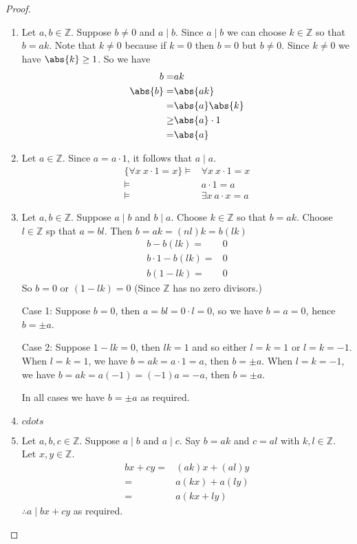 \begin{proof}
\leavevmode
\begin{enumerate}
    \item Let $a,b\in\mathbb{Z}$. Suppose $b\neq 0$ and $a\mid b$. Since $a\mid b$ we can choose $k\in\mathbb{Z}$ so that $b=ak$. Note that $k\neq 0$ because if $k=0$ then $b = 0$ but $b\neq 0$. Since $k\neq 0$ we have $\abs{k}\geq 1$. So we have 
    \begin{align*}
        b =& ak \\
        \abs{b} = & \abs{ak} \\
         = & \abs{a} \abs{k}\\
        \geq & \abs{a}\cdot 1 \\
        = & \abs{a}
    \end{align*}
    \item Let $a\in\mathbb{Z}$. Since $a= a\cdot 1$, it follows that $a\mid a$.
    \begin{align*}
        \{\forall x \ x\cdot 1 = x\} \vDash & \forall x \ x\cdot 1 = x \\
        \vDash & a\cdot 1 = a \\
        \vDash & \exists x \ a\cdot x = a
    \end{align*}
    \item Let $a,b\in\mathbb{Z}$. Suppose $a\mid b$ and $b\mid a$. Choose $k\in\mathbb{Z}$ so that $b=ak$. Choose $l\in\mathbb{Z}$ sp that $a=bl$. Then $b=ak=(nl)k = b(lk)$
    \begin{align*}
        b - b(lk) =& 0 \\
        b\cdot 1 - b(lk) = & 0 \\
        b(1-lk) = & 0 
    \end{align*}
    So $b=0$ or $(1-lk) = 0$ (Since $\mathbb{Z}$ has no zero divisors.)
    
    Case 1: Suppose $b=0$, then $a = bl = 0\cdot l = 0$, so we have $b = a = 0$, hence $b=\pm a$.
    
    Case 2: Suppose $1-lk = 0$, then $lk = 1$ and so either $l=k=1$ or $l=k=-1$. When $l=k=1$, we have $b = ak = a\cdot 1 = a$, then $b =\pm a$. When $l=k=-1$, we have $b = ak = a (-1) = (-1) a = -a$, then $b=\pm a$.
    
    In all cases we have $b=\pm a$ as required.
    
    \item $cdots$
    \item Let $a,b,c\in\mathbb{Z}$. Suppose $a\mid b$ and $a\mid c$. Say $b=ak$ and $c=al$ with $k,l\in\mathbb{Z}$. Let $x,y\in\mathbb{Z}$.
    \begin{align*}
        bx + cy =& (ak)x + (al)y \\ 
        = & a(kx) + a(ly) \\
        =& a(kx+ly)
    \end{align*}
    $\therefore a\mid bx+cy$ as required.
\end{enumerate}
\end{proof}

